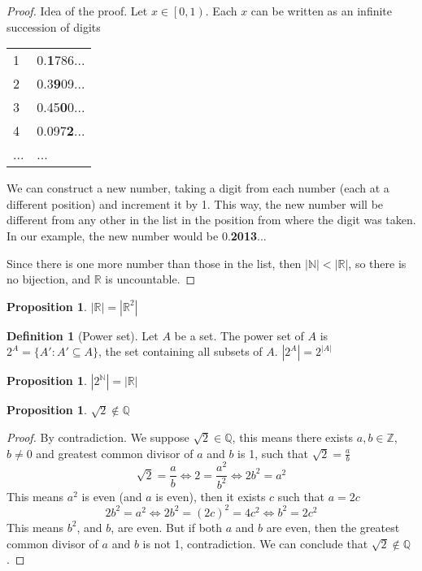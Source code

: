 \documentclass{article}
\newcommand{\fr}[2]{\frac{#1}{#2}}
\newcommand{\intco}[1]{\left[#1\right)}
\theoremstyle{definition}
\newtheorem{definition}{Definition}[section]
\theoremstyle{definition}
\theoremstyle{plain}
\theoremstyle{plain}
\theoremstyle{plain}
\theoremstyle{plain}
\newtheorem{proposition}[theorem]{Proposition}
\theoremstyle{definition}
\theoremstyle{remark}
\theoremstyle{remark}
\theoremstyle{remark}
\theoremstyle{remark}
\newcommand{\N}{\mathbb{N}}
\newcommand{\Z}{\mathbb{Z}}
\newcommand{\Q}{\mathbb{Q}}
\newcommand{\R}{\mathbb{R}}
\begin{document}
\begin{proof}
  Idea of the proof. Let $x \in \intco{0,1}$. Each $x$ can be written as an infinite succession of digits
  
  \begin{center}\begin{tabular}{l|l}
    1 & 0.\textbf{1}786... \\
    2 & 0.3\textbf{9}09... \\
    3 & 0.45\textbf{0}0... \\
    4 & 0.097\textbf{2}... \\
    ... & ...
  \end{tabular}\end{center}
  
  We can construct a new number, taking a digit from each number (each at a different position) and increment it by 1. This way, the new number will be different from any other in the list in the position from where the digit was taken. In our example, the new number would be 0.\textbf{2013}...

  Since there is one more number than those in the list, then $|\N| < |\R|$, so there is no bijection, and $\R$ is uncountable.
\end{proof}


\begin{proposition}
  $|\R| = |\R^2|$
\end{proposition}


\begin{definition}[Power set]
  Let $A$ be a set. The power set of $A$ is $2^A = \{ A' : A' \subseteq A \}$, the set containing all subsets of $A$. $|2^A| = 2^{|A|}$
\end{definition}


\begin{proposition}
  $|2^{\N}| = |\R|$
\end{proposition}


\begin{proposition}
  $\sqrt{2} \notin \Q$
\end{proposition}

\begin{proof}
  By contradiction. We suppose $\sqrt{2} \in \Q$, this means there exists $a, b \in \Z$, $b \neq 0$ and greatest common divisor of $a$ and $b$ is 1, such that $\sqrt{2} = \frac{a}{b}$
  \[
  \sqrt{2} = \fr{a}{b} \iff 2 = \fr{a^2}{b^2} \iff 2b^2 = a^2
  \]
  This means $a^2$ is even (and $a$ is even), then it exists $c$ such that $a = 2c$
  \[
  2b^2 = a^2 \iff 2b^2 = (2c)^2 = 4c^2 \iff b^2 = 2c^2
  \]
  This means $b^2$, and $b$, are even. But if both $a$ and $b$ are even, then the greatest common divisor of $a$ and $b$ is not 1, contradiction. We can conclude that $\sqrt{2} \notin \Q$.
\end{proof}
\end{document}
